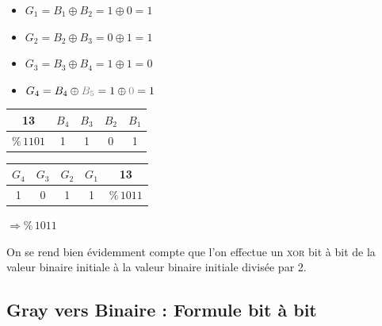 \documentclass[11pt,a4paper]{article}
\begin{document}
\begin{table}[!ht]
  \centering
  \begin{minipage}{0.40\textwidth}

\begin{itemize}
\item $ G_{1} = B_{1} \oplus B_{2} = 1 \oplus 0 = 1 $
\item $ G_{2} = B_{2} \oplus B_{3} = 0 \oplus 1 = 1 $
\item $ G_{3} = B_{3} \oplus B_{4} = 1 \oplus 1 = 0 $
\item $ G_{4} = B_{4} \oplus \textcolor{gray}{B_{5}} = 1 \oplus \textcolor{gray}{0} = 1 $
\end{itemize}

  \end{minipage}
  \hfillx
  \begin{minipage}{0.60\textwidth}
    \centering

\begin{tabular}{ c  | c | c | c | c | }
13                    & $B_{4}$ & $B_{3}$ & $B_{2}$ & $B_{1}$ \\
\hline
$ \text{\%} \, 1101 $ & 1 & 1 & 0 & 1 \\
\end{tabular}

\bigskip

\begin{tabular}{ | c | c | c | c |   c }
$G_{4}$ & $G_{3}$ & $G_{2}$ & $G_{1}$  & 13\\
\hline
1 & 0 & 1 & 1                          & $ \text{\%} \, 1011 $\\
\end{tabular}

\bigskip

$ \Rightarrow \text{\%} \, 1011 $

  \end{minipage}
\end{table}

\medskip

On se rend bien évidemment compte que l'on effectue un \textsc{xor} bit à bit de la valeur binaire initiale à la valeur binaire initiale divisée par 2.


\bigskip


\subsection{Gray vers Binaire : Formule bit à bit}
\end{document}
